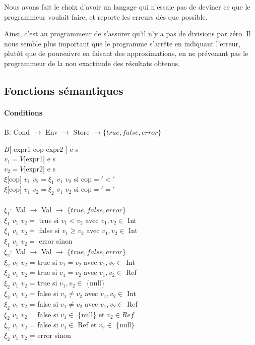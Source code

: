 	Nous avons fait le choix d'avoir un langage qui n'essaie pas de deviner ce que le programmeur
	voulait faire, et reporte les erreurs dès que possible. 

	Ainsi, c'est au programmeur de s'assurer qu'il n'y a pas de divisions par zéro. Il nous semble
	plus important que le programme s'arrête en indiquant l'erreur, plutôt que de poursuivre en
	faisant des approximations, en ne prévenant pas le programmeur de la non exactitude des résultats
	obtenus. 

\subsection{Fonctions sémantiques}
\paragraph{Conditions} B: Cond $\rightarrow$ Env $\rightarrow$ Store $\rightarrow \{true, false, error\}$

$B[$ expr1 cop expr2 $]$ e s\\
$v_1 = V[$expr1$]$ e s\\
$v_2 = V[$expr2$]$ e s\\
$\xi[$cop$]$ $v_1$ $v_2 = \xi_1$ $v_1$ $v_2$ si cop$= '<'$\\
$\xi[$cop$]$ $v_1$ $v_2 = \xi_2$ $v_1$ $v_2$ si cop$= '='$\\
\\
$\xi_1 :$ Val $\rightarrow$ Val $\rightarrow$ $\{true,false,error\}$\\
$\xi_1$ $v_1$ $v_2 = $ true si $v_1 < v_2$ avec $v_1,v_2 \in $ Int\\
$\xi_1$ $v_1$ $v_2 = $ false si $v_1 \geq v_2$ avec $v_1,v_2 \in $ Int\\
$\xi_1$ $v_1$ $v_2 = $ error sinon\\

$\xi_2 :$ Val $\rightarrow$ Val $\rightarrow$ $\{true,false,error\}$\\
$\xi_2$ $v_1$ $v_2$ =  true si $v_1 = v_2$ avec $v_1,v_2 \in $ Int\\
$\xi_2$ $v_1$ $v_2$ =  true si $v_1 = v_2$ avec $v_1,v_2 \in $ Ref\\
$\xi_2$ $v_1$ $v_2$ =  true si $v_1,v_2 \in $ \{null\} \\
$\xi_2$ $v_1$ $v_2$ =  false si $v_1 \neq v_2$ avec $v_1,v_2 \in $ Int\\
$\xi_2$ $v_1$ $v_2$ =  false si $v_1 \neq v_2$ avec $v_1,v_2 \in $ Ref\\
$\xi_2$ $v_1$ $v_2$ =  false si $v_1  \in $ \{null\} et $v_2 \in Ref$\\
$\xi_2$ $v_1$ $v_2$ =  false si $v_1  \in $ Ref et $v_2 \in $ \{null\}\\
$\xi_2$ $v_1$ $v_2$ =  error sinon\\

